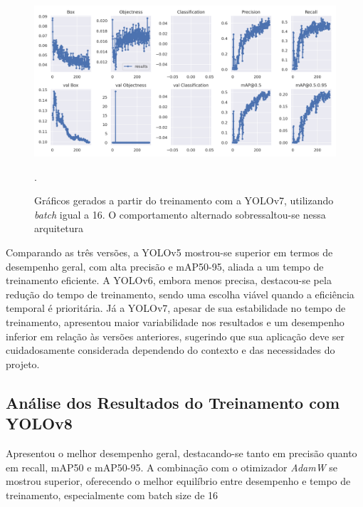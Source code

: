 \begin{figure}[!h]
    \centering
    \begin{minipage}{1\linewidth}
    \centering
    \captionsetup{justification=centering,margin=0.5cm,font=small}
    \includegraphics[width=1\linewidth]{img/cap6/results-yolov7-batch-16.png}
    \caption{Gráficos gerados a partir do treinamento com a YOLOv7, utilizando \textit{batch} igual a 16. O comportamento alternado sobressaltou-se nessa arquitetura}.
    \label{fig:yolov5batch16}
    \end{minipage}
\end{figure}

Comparando as três versões, a YOLOv5 mostrou-se superior em termos de desempenho geral, com alta precisão e mAP50-95, aliada a um tempo de treinamento eficiente. A YOLOv6, embora menos precisa, destacou-se pela redução do tempo de treinamento, sendo uma escolha viável quando a eficiência temporal é prioritária. Já a YOLOv7, apesar de sua estabilidade no tempo de treinamento, apresentou maior variabilidade nos resultados e um desempenho inferior em relação às versões anteriores, sugerindo que sua aplicação deve ser cuidadosamente considerada dependendo do contexto e das necessidades do projeto.

\subsection{Análise dos Resultados do Treinamento com YOLOv8}

Apresentou o melhor desempenho geral, destacando-se tanto em precisão quanto em recall, mAP50 e mAP50-95. A combinação com o otimizador \textit{AdamW} se mostrou superior, oferecendo o melhor equilíbrio entre desempenho e tempo de treinamento, especialmente com batch size de 16

